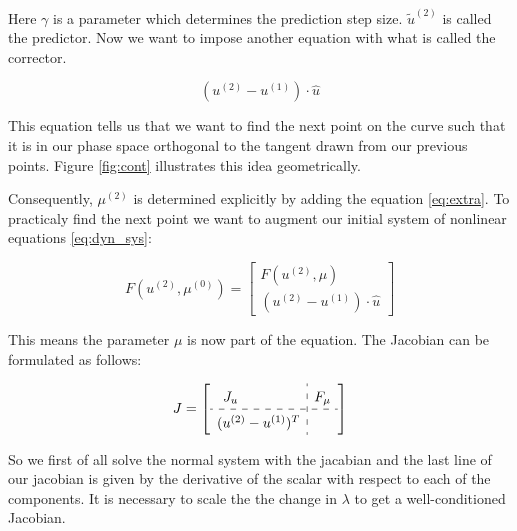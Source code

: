 Here $\gamma$ is a parameter which determines the prediction step size.
$\tilde{u}^{(2)}$ is called the predictor. Now we want to impose another
equation with what is called the corrector.

\begin{equation}
  (u^{(2)} - u^{(1)})  \cdot \hat{u} \label{eq:extra}
\end{equation}

This equation tells us that we want to find the next point on the curve such that it   
is in our phase space orthogonal to the tangent drawn from our previous points. Figure
\ref{fig:cont} illustrates this idea geometrically.

Consequently, $\mu^{(2)}$ is determined explicitly by adding the equation
\eqref{eq:extra}. To practicaly find the next point we want to augment our
initial system of nonlinear equations \eqref{eq:dyn_sys}:

\begin{equation}
  F(u^{(2)}, \mu^{(0)}) = 
\begin{bmatrix} F(u^{(2)}, \mu) \\ (u^{(2)} - u^{(1)})  \cdot \hat{u}
\end{bmatrix} \label{eq:dyn_sys_cont}
\end{equation}

This means the parameter $\mu$ is now part of the equation. The Jacobian can be
formulated as follows: 

\begin{center}
\[
\renewcommand\arraystretch{1.5}
J = 
\left[
\begin{array}{c:c}
  J_u \quad \quad \quad \quad & F_{\mu} \\
  \hdashline
  (u^{(2)} - u^{(1)})^T
\end{array} \label{eq:jac_aug}
\right]
\]
\end{center}

So we first of all solve the normal system with the jacabian and the last line
of our jacobian is given by the derivative of the scalar with respect to each
of the components. It is necessary to   scale the the change in $\lambda$ to
get a well-conditioned Jacobian.

